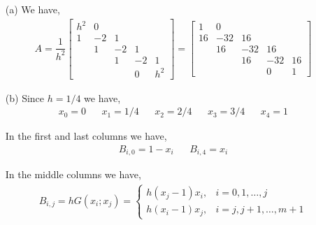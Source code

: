 \documentclass[10pt]{article}
\begin{document}
\begin{solution}[Solution]

\begin{enumerate}
    \item[(a)] We have,
        \begin{align*}
            A=
            \dfrac{1}{h^2}\left[\begin{array}{rrrrr}
                h^2 & 0 \\
                1 & -2 & 1 \\
                & 1 & -2 & 1 \\
                && 1 & -2 & 1 \\
                &&& 0 & h^2 
            \end{array}\right]
            =
            \left[\begin{array}{rrrrr}
                1 & 0 \\
                16 & -32 & 16 \\
                & 16 & -32 & 16 \\
                && 16 & -32 & 16 \\
                &&& 0 & 1
            \end{array}\right]
        \end{align*}
    \item[(b)]
        Since \( h=1/4 \) we have,
        \begin{align*}
            x_0 = 0 && x_1 = 1/4 && x_2 = 2/4 && x_3 = 3/4 && x_4 = 1
        \end{align*}

        In the first and last columns we have,
        \begin{align*}
            B_{i,0} = 1-x_i && B_{i,4} = x_i
        \end{align*}

        In the middle columns we have,
        \begin{align*}
            B_{i,j} = h G(x_i;x_j) = \begin{cases}
                h(x_j-1)x_i, & i=0,1,\ldots,j \\
                h(x_i-1)x_j, & i=j, j+1, \ldots, m+1
            \end{cases}
        \end{align*}
        

\end{enumerate}
\end{solution}
\end{document}
